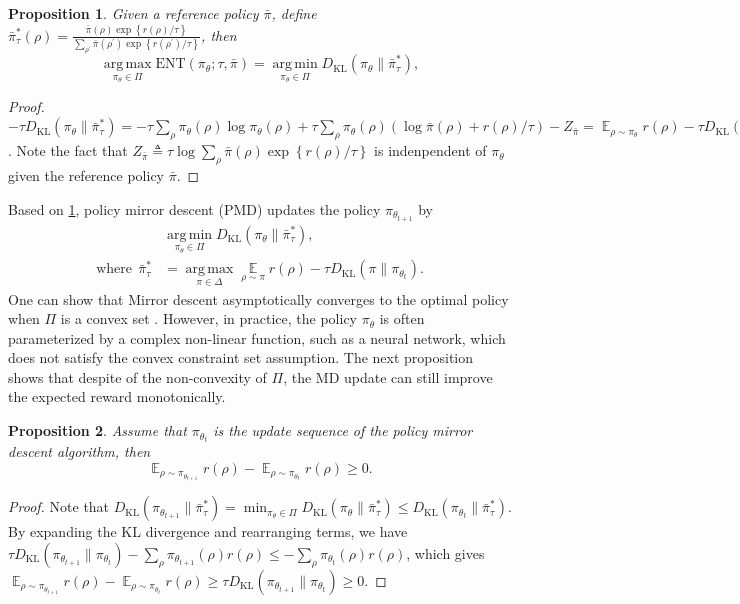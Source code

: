 \documentclass{article}
\DeclareMathOperator*\argmin{arg\,min}
\DeclareMathOperator*\argmax{arg\,max}
\DeclareMathOperator*\ep{\mathbb{E}}
\DeclareMathOperator\oep{\mathbb{E}}
\newcommand*{\refPi}{\bar{\pi}}
\newcommand{\KL}{D_{\text{KL}}}
\newcommand{\ENT}{\text{ENT}}
\newtheorem{prop}{Proposition}
\begin{document}
\begin{prop}
	\label{prop:mirrordescent_projection}
	Given a \emph{reference policy} $\refPi$, define $\bar{\pi}_\tau^*(\rho) =  \frac{\refPi(\rho) \exp\left\{ r(\rho) / \tau \right\}}{ \sum_{\rho^{\prime}}{\refPi(\rho^{\prime}) \exp\left\{ r(\rho^{\prime}) / \tau \right\} } }$, then
	\[
	\argmax\limits_{\pi_\theta \in \Pi}{\ENT(\pi_\theta; \tau, \refPi)}= \argmin\limits_{\pi_\theta \in \Pi}{ \KL(\pi_\theta \| \bar{\pi}_\tau^*) } ,
	\]
\end{prop}
\begin{proof}
	$-\tau \KL(\pi_\theta \| \bar{\pi}_\tau^*) = - \tau \sum_{\rho}{ \pi_\theta(\rho) \log \pi_\theta(\rho) } + \tau \sum_{\rho}{ \pi_\theta(\rho) (\log \refPi(\rho) + r(\rho) / \tau ) }  - Z_{\refPi} = \ep_{\rho \sim \pi_\theta}{  r(\rho)  - \tau \KL(\pi_\theta \| \refPi) } - Z_{\refPi}$. Note the fact that $Z_{\refPi} \triangleq \tau \log{ \sum_{\rho}{\refPi(\rho) \exp\left\{ r(\rho) / \tau \right\} } }$ is indenpendent of $\pi_\theta$ given the reference policy $\refPi$.
\end{proof}
Based on \cref{prop:mirrordescent_projection}, policy mirror descent (PMD) updates the policy $\pi_{\theta_{t+1}}$ by
\begin{equation}
\label{eq:pmd}
\begin{split}
&\argmin\limits_{\pi_\theta \in \Pi}{\KL( \pi_\theta \| \bar{\pi}_{\tau}^* )}, \\
\text{where}\ \ \bar{\pi}_{\tau}^* & =  \argmax\limits_{\pi \in \Delta}{ \ep\limits_{\rho \sim \pi}{  r(\rho)  - \tau \KL(\pi \| \pi_{\theta_t}) } }.
\end{split}
\end{equation}
One can show that Mirror descent asymptotically converges to the optimal policy when $\Pi$ is a convex set \cite{nemirovskii1983problem,beck2003mirror}. However, in practice, the policy $\pi_\theta$ is often parameterized by a complex non-linear function, such as a neural network, which does not satisfy the convex constraint set assumption. The next proposition shows that despite of the non-convexity of $\Pi$, the MD update can still improve the expected reward monotonically.
\begin{prop}
	\label{prop:monoto_policymirrordescent}
	Assume that $\pi_{\theta_{t}}$ is the update sequence of the policy mirror descent algorithm, then 
\[
\oep_{\rho \sim \pi_{\theta_{t+1}}}{r(\rho)} - \oep_{\rho \sim \pi_{\theta_{t}}}{  r(\rho)} \ge 0.
\] 
\end{prop}
\begin{proof}
	Note that $\KL(\pi_{\theta_{t+1}} \| \bar{\pi}_\tau^*)  = \min_{\pi_\theta \in \Pi}{ \KL(\pi_\theta \| \bar{\pi}_\tau^*)} \leq \KL(\pi_{\theta_{t}} \| \bar{\pi}_\tau^*)$. By expanding the KL divergence and rearranging terms, we have $ \tau \KL(\pi_{\theta_{t+1}} \| \pi_{\theta_{t}}) - \sum_{\rho}{ \pi_{\theta_{t+1}}(\rho) r(\rho) } \leq - \sum_{\rho}{ \pi_{\theta_{t}}(\rho) r(\rho) }$, which gives $\ep_{\rho \sim \pi_{\theta_{t+1}}}{  r(\rho)} - \ep_{\rho \sim \pi_{\theta_{t}}}{  r(\rho)} \geq \tau \KL(\pi_{\theta_{t+1}} \| \pi_{\theta_{t}}) \geq 0$.
\end{proof}
\end{document}
